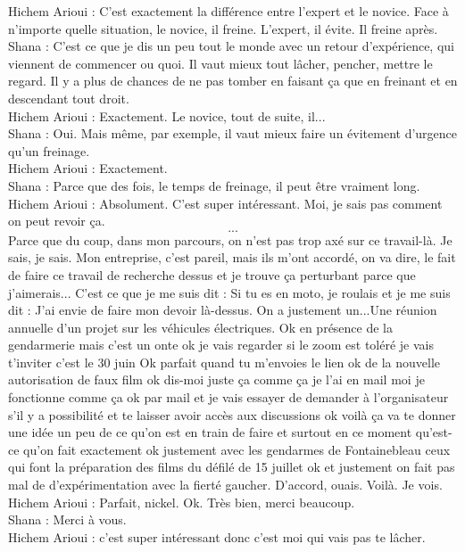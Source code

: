 Hichem Arioui : C'est exactement la différence entre l'expert et le novice. Face à n'importe quelle situation, le novice, il freine. L'expert, il évite. Il freine après. \\
Shana : C'est ce que je dis un peu tout le monde avec un retour d'expérience, qui viennent de commencer ou quoi. Il vaut mieux tout lâcher, pencher, mettre le regard. Il y a plus de chances de ne pas tomber en faisant ça que en freinant et en descendant tout droit. \\
Hichem Arioui : Exactement. Le novice, tout de suite, il... \\
Shana : Oui. Mais même, par exemple, il vaut mieux faire un évitement d'urgence qu'un freinage. \\
Hichem Arioui : Exactement. \\
Shana : Parce que des fois, le temps de freinage, il peut être vraiment long. \\
Hichem Arioui : Absolument. C'est super intéressant. Moi, je sais pas comment on peut revoir ça. \\
\[...\]
\ifconfidentiel
Parce que du coup, dans mon parcours, on n'est pas trop axé sur ce travail-là. Je sais, je sais. Mon entreprise, c'est pareil, mais ils m'ont accordé, on va dire, le fait de faire ce travail de recherche dessus et je trouve ça perturbant parce que j'aimerais... C'est ce que je me suis dit : Si tu es en moto, je roulais et je me suis dit : J'ai envie de faire mon devoir là-dessus. 
On a justement un...Une réunion annuelle d'un projet sur les véhicules électriques. Ok en présence de la gendarmerie mais c'est un onte ok je vais regarder si le zoom est toléré je vais t'inviter c'est le 30 juin Ok parfait quand tu m'envoies le lien ok de la nouvelle autorisation de faux film ok dis-moi juste ça comme ça je l'ai en mail moi je fonctionne comme ça ok par mail et je vais essayer de demander à l'organisateur s'il y a possibilité et te laisser avoir accès aux discussions ok voilà ça va te donner une idée un peu de ce qu'on est en train de faire et surtout en ce moment qu'est-ce qu'on fait exactement ok justement avec les gendarmes de Fontainebleau ceux qui font la préparation des films du défilé de 15 juillet ok et justement on fait pas mal de d'expérimentation avec la fierté gaucher. D'accord, ouais. Voilà. Je vois. 
\fi
Hichem Arioui : Parfait, nickel. Ok. Très bien, merci beaucoup. \\
Shana : Merci à vous.\\
Hichem Arioui : c'est super intéressant donc c'est moi qui vais pas te lâcher. \\
